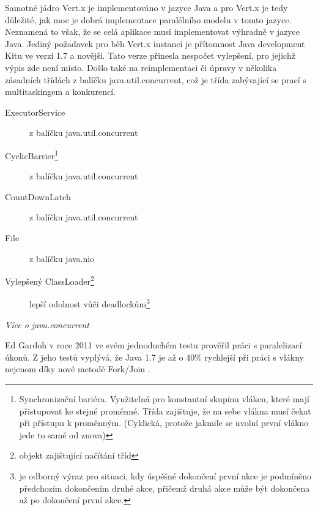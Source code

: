 Samotné jádro Vert.x je implementováno v jazyce Java a pro Vert.x je tedy důležité, jak moc je dobrá implementace paralélního modelu v tomto jazyce. Neznamená to však, že se celá aplikace musí implementovat výhradně v jazyce Java. Jediný požadavek pro běh Vert.x instancí je přítomnost Java development Kitu ve verzi 1.7 a novější. Tato verze přinesla nespočet vylepšení, pro jejichž výpis zde není místo. Došlo také na reimplementaci či úpravy v několika zásadních třídách z balíčku java.util.concurrent, což je třída zabývající se prací s multitaskingem a konkurencí.
\begin{description}
\item[ExecutorService]{z balíčku java.util.concurrent}
\item[CyclicBarrier\footnote{Synchronizační bariéra. Využitelná pro konstantní skupinu vláken, které mají přistupovat ke stejné proměnné. Třída zajištuje, že na sebe vlákna musí čekat při přístupu k proměnným. (Cyklická, protože jakmile se uvolní první vlákno jede to samé od znova)}]{z balíčku java.util.concurrent}
\item[CountDownLatch]{z balíčku java.util.concurrent}
\item[File]{z balíčku java.nio}
\item[Vylepšený ClassLoader\footnote{objekt zajištující načítání tříd}]{lepší odolnost vůči deadlockům\footnote{ je odborný výraz pro situaci, kdy úspěšné dokončení první akce je podmíněno předchozím dokončením druhé akce, přičemž druhá akce může být dokončena až po dokončení první akce.}}
\end{description}
\emph{Více o java.concurrent \cite{javaChangelog}}

Ed Gardoh v roce 2011 ve svém jednoduchém testu \cite{serialTest} prověřil práci s paralelizací úkonů. Z jeho testů vyplývá, že Java 1.7 je až o 40\% rychlejší při práci s vlákny nejenom díky nové metodě Fork/Join \cite{forkJoin}.

